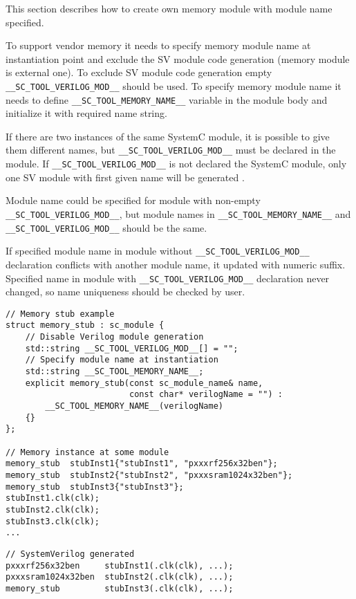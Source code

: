 This section describes how to create own memory module with module name specified. 

To support vendor memory it needs to specify memory module name at instantiation point and exclude the SV module code generation (memory module is external one). To exclude SV module code generation empty {\tt \_\_SC\_TOOL\_VERILOG\_MOD\_\_} should be used. To specify memory module name it needs to define {\tt \_\_SC\_TOOL\_MEMORY\_NAME\_\_} variable in the module body and initialize it with required name string.

If there are two instances of the same SystemC module, it is possible to give them different names, but {\tt \_\_SC\_TOOL\_VERILOG\_MOD\_\_} must be declared in the module. If {\tt \_\_SC\_TOOL\_VERILOG\_MOD\_\_} is not declared the SystemC module, only one SV module with first given name will be generated . 

Module name could be specified for module with non-empty {\tt \_\_SC\_TOOL\_VERILOG\_MOD\_\_}, but module names in {\tt \_\_SC\_TOOL\_MEMORY\_NAME\_\_} and {\tt \_\_SC\_TOOL\_VERILOG\_MOD\_\_} should be the same.

If specified module name in module without {\tt \_\_SC\_TOOL\_VERILOG\_MOD\_\_} declaration conflicts with another module name, it updated with numeric suffix. Specified name in module with {\tt \_\_SC\_TOOL\_VERILOG\_MOD\_\_}  declaration never changed, so name uniqueness should be checked by user.

\begin{lstlisting}[style=mycpp]
// Memory stub example
struct memory_stub : sc_module {
    // Disable Verilog module generation
    std::string __SC_TOOL_VERILOG_MOD__[] = "";  
    // Specify module name at instantiation
    std::string __SC_TOOL_MEMORY_NAME__;             
    explicit memory_stub(const sc_module_name& name,
                         const char* verilogName = "") :
        __SC_TOOL_MEMORY_NAME__(verilogName)
    {}
};

// Memory instance at some module
memory_stub  stubInst1{"stubInst1", "pxxxrf256x32ben"};
memory_stub  stubInst2{"stubInst2", "pxxxsram1024x32ben"};
memory_stub  stubInst3{"stubInst3"};
stubInst1.clk(clk); 
stubInst2.clk(clk); 
stubInst3.clk(clk); 
...
\end{lstlisting}
%
\begin{lstlisting}[style=mycpp]
// SystemVerilog generated 
pxxxrf256x32ben     stubInst1(.clk(clk), ...);
pxxxsram1024x32ben  stubInst2(.clk(clk), ...);
memory_stub         stubInst3(.clk(clk), ...);
\end{lstlisting}


